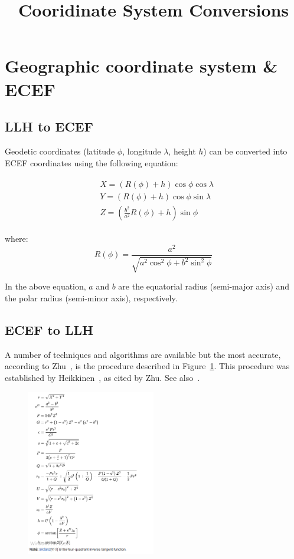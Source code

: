\documentclass{article}
\begin{document}
\title{Cooridinate System Conversions}
\maketitle
\section{Geographic coordinate system \& ECEF}

\subsection{LLH to ECEF}

Geodetic coordinates (latitude  $\phi$, longitude   $\lambda$, height $h$) can
be converted into ECEF coordinates using the following equation:

\begin{align*}
\begin{split}
& X = ( R(\phi) + h) \cos \phi \cos \lambda \\ 
& Y = ( R(\phi) + h) \cos \phi \sin \lambda \\
& Z = ( \frac{b^2}{a^2}R(\phi) + h) \sin \phi 
\end{split}
\end{align*}

where:
\begin{equation}
R(\phi) = \frac{a^2}{\sqrt{a^2 \cos ^2 \phi + b^2 \sin ^2 \phi}}
\end{equation}

In the above equation, $a$ and $b$ are the equatorial radius
(semi-major axis) and the polar radius (semi-minor axis), respectively.

\subsection{ECEF to LLH}
A number of techniques and algorithms are available but the most accurate,
according to Zhu~\cite{zhu}, is the procedure described in
Figure~\ref{fig:ecef2llh}. This procedure was established by
Heikkinen~\cite{heikkinen1982geschlossene}, as cited by Zhu.
See also~\cite{osen2017accurate}.


\begin{figure}[h]\label{fig:ecef2llh}
\includegraphics[width=0.5\textwidth,height=0.5\textheight,keepaspectratio]{figures/ecef2llh}
\end{figure}
\end{document}
